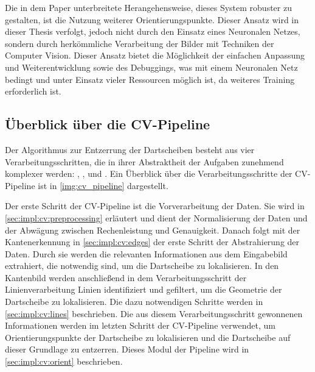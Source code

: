 Die in dem Paper unterbreitete Herangehensweise, dieses System robuster zu gestalten, ist die Nutzung weiterer Orientierungspunkte. Dieser Ansatz wird in dieser Thesis verfolgt, jedoch nicht durch den Einsatz eines Neuronalen Netzes, sondern durch herkömmliche Verarbeitung der Bilder mit Techniken der Computer Vision. Dieser Ansatz bietet die Möglichkeit der einfachen Anpassung und Weiterentwicklung sowie des Debuggings, was mit einem Neuronalen Netz bedingt und unter Einsatz vieler Ressourcen möglich ist, da weiteres Training erforderlich ist.



\subsection{Überblick über die CV-Pipeline}
\label{sec:impl:cv:pipeline}

Der Algorithmus zur Entzerrung der Dartscheiben besteht aus vier Verarbeitungsschritten, die in ihrer Abstraktheit der Aufgaben zunehmend komplexer werden: , ,  und . Ein Überblick über die Verarbeitungsschritte der CV-Pipeline ist in \autoref{img:cv_pipeline} dargestellt.

Der erste Schritt der CV-Pipeline ist die Vorverarbeitung der Daten. Sie wird in \autoref{sec:impl:cv:preprocessing} erläutert und dient der Normalisierung der Daten und der Abwägung zwischen Rechenleistung und Genauigkeit. Danach folgt mit der Kantenerkennung in \autoref{sec:impl:cv:edges} der erste Schritt der Abstrahierung der Daten. Durch sie werden die relevanten Informationen aus dem Eingabebild extrahiert, die notwendig sind, um die Dartscheibe zu lokalisieren. In den Kantenbild werden anschließend in dem Verarbeitungsschritt der Linienverarbeitung Linien identifiziert und gefiltert, um die Geometrie der Dartscheibe zu lokalisieren. Die dazu notwendigen Schritte werden in \autoref{sec:impl:cv:lines} beschrieben. Die aus diesem Verarbeitungsschritt gewonnenen Informationen werden im letzten Schritt der CV-Pipeline verwendet, um Orientierungspunkte der Dartscheibe zu lokalisieren und die Dartscheibe auf dieser Grundlage zu entzerren. Dieses Modul der Pipeline wird in \autoref{sec:impl:cv:orient} beschrieben.

